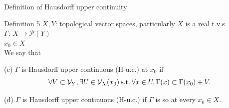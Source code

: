 \documentclass[aspectratio=169, dvipdfmx, 11pt]{beamer} %
\newcommand{\SuchThat}{\:\text{s.t.}\:}
\begin{document}
\begin{frame}[t]{Definition of Hausdorff upper continuity}
  \begin{block}{Definition 5}
    $X, Y$: topological vector spaces, particularly $X$ is a real t.v.s\\
    $\Gamma$: $X \rightarrow \mathcal{P}(Y)$ \\
    $x_0 \in X$ \\
    \medskip
    We say that

    (c) $\Gamma$ is Hausdorff upper continuous (H-u.c.) at $x_0$ if
    \begin{equation}
      \forall V \subset \mathcal{V}_Y, \exists U \in \mathcal{V}_{X}(x_0) \SuchThat \forall x \in U, \Gamma (x) \subset \Gamma (x_0) + V. \notag
    \end{equation}

    (d) $\Gamma$ is Hausdorff upper continuous (H-u.c.) if $\Gamma$ is so at every $x_0 \in X$.
  \end{block}
\end{frame}
\end{document}
